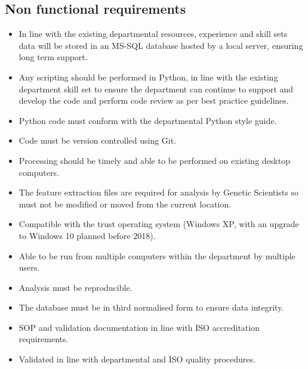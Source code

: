 \subsection{Non functional requirements}
\begin{itemize}
\item In line with the existing departmental resources, experience and skill sets data will be stored in an MS-SQL database hosted by a local server, ensuring long term support.
\item Any scripting should be performed in Python, in line with the existing department skill set to ensure the department can continue to support and develop the code and perform code review as per best practice guidelines. 
\item Python code must conform with the departmental Python style guide.
\item Code must be version controlled using Git.
\item Processing should be timely and able to be performed on existing desktop computers.
\item The feature extraction files are required for analysis by Genetic Scientists so must not be modified or moved from the current location.
\item Compatible with the trust operating system (Windows XP, with an upgrade to Windows 10 planned before 2018).
\item Able to be run from multiple computers within the department by multiple users.
\item Analysis must be reproducible.
\item The database must be in third normalised form to ensure data integrity.
\item \ac{SOP} and validation documentation in line with ISO accreditation requirements.
\item Validated in line with departmental and ISO quality procedures.
\end{itemize}
